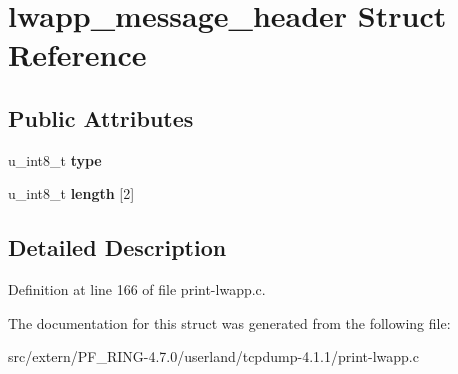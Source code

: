 \hypertarget{structlwapp__message__header}{
\section{lwapp\_\-message\_\-header Struct Reference}
\label{structlwapp__message__header}
}
\subsection*{Public Attributes}
\begin{DoxyCompactItemize}
\item 
\hypertarget{structlwapp__message__header_a9407dd8cbc5e64ccf7d2612ffe116b2d}{
u\_\-int8\_\-t {\bfseries type}}
\label{structlwapp__message__header_a9407dd8cbc5e64ccf7d2612ffe116b2d}

\item 
\hypertarget{structlwapp__message__header_a40950f7fd54a1d4a110e415515a13aed}{
u\_\-int8\_\-t {\bfseries length} \mbox{[}2\mbox{]}}
\label{structlwapp__message__header_a40950f7fd54a1d4a110e415515a13aed}

\end{DoxyCompactItemize}


\subsection{Detailed Description}


Definition at line 166 of file print-\/lwapp.c.



The documentation for this struct was generated from the following file:\begin{DoxyCompactItemize}
\item 
src/extern/PF\_\-RING-\/4.7.0/userland/tcpdump-\/4.1.1/print-\/lwapp.c\end{DoxyCompactItemize}
